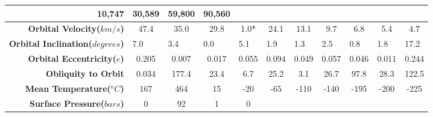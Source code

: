 \begin{landscape}
\begin{table}[H]
\begin{tabular}{|r|c|c|c|c|c|c|c|c|c|c|}
  \cellcolor[HTML]{F5F5F5}10,747 &
  \cellcolor[HTML]{FFFFFF}30,589 &
  \cellcolor[HTML]{F5F5F5}59,800 &
  \cellcolor[HTML]{FFFFFF}90,560 \\ \hline
\textbf{Orbital Velocity($km/s$)} &
  \cellcolor[HTML]{F5F5F5}47.4 &
  \cellcolor[HTML]{FFFFFF}35.0 &
  \cellcolor[HTML]{F5F5F5}29.8 &
  \cellcolor[HTML]{FFFFFF}1.0* &
  \cellcolor[HTML]{F5F5F5}24.1 &
  \cellcolor[HTML]{FFFFFF}13.1 &
  \cellcolor[HTML]{F5F5F5}9.7 &
  \cellcolor[HTML]{FFFFFF}6.8 &
  \cellcolor[HTML]{F5F5F5}5.4 &
  \cellcolor[HTML]{FFFFFF}4.7 \\ \hline
\textbf{Orbital Inclination($degrees$)} &
  \multicolumn{1}{l|}{\cellcolor[HTML]{F5F5F5}7.0} &
  \multicolumn{1}{l|}{\cellcolor[HTML]{FFFFFF}3.4} &
  \multicolumn{1}{l|}{\cellcolor[HTML]{F5F5F5}0.0} &
  \multicolumn{1}{l|}{\cellcolor[HTML]{FFFFFF}5.1} &
  \multicolumn{1}{l|}{\cellcolor[HTML]{F5F5F5}1.9} &
  \multicolumn{1}{l|}{\cellcolor[HTML]{FFFFFF}1.3} &
  \multicolumn{1}{l|}{\cellcolor[HTML]{F5F5F5}2.5} &
  \multicolumn{1}{l|}{\cellcolor[HTML]{FFFFFF}0.8} &
  \multicolumn{1}{l|}{\cellcolor[HTML]{F5F5F5}1.8} &
  \multicolumn{1}{l|}{\cellcolor[HTML]{FFFFFF}17.2} \\ \hline
\textbf{Orbital Eccentricity($e$)} &
  \cellcolor[HTML]{F5F5F5}0.205 &
  \cellcolor[HTML]{FFFFFF}0.007 &
  \cellcolor[HTML]{F5F5F5}0.017 &
  \cellcolor[HTML]{FFFFFF}0.055 &
  \cellcolor[HTML]{F5F5F5}0.094 &
  \cellcolor[HTML]{FFFFFF}0.049 &
  \cellcolor[HTML]{F5F5F5}0.057 &
  \cellcolor[HTML]{FFFFFF}0.046 &
  \cellcolor[HTML]{F5F5F5}0.011 &
  \cellcolor[HTML]{FFFFFF}0.244 \\ \hline
\textbf{Obliquity to Orbit} &
  \cellcolor[HTML]{F5F5F5}0.034 &
  \cellcolor[HTML]{FFFFFF}177.4 &
  \cellcolor[HTML]{F5F5F5}23.4 &
  \cellcolor[HTML]{FFFFFF}6.7 &
  \cellcolor[HTML]{F5F5F5}25.2 &
  \cellcolor[HTML]{FFFFFF}3.1 &
  \cellcolor[HTML]{F5F5F5}26.7 &
  \cellcolor[HTML]{FFFFFF}97.8 &
  \cellcolor[HTML]{F5F5F5}28.3 &
  \cellcolor[HTML]{FFFFFF}122.5 \\ \hline
\textbf{Mean Temperature($^oC$)} &
  \cellcolor[HTML]{F5F5F5}167 &
  \cellcolor[HTML]{FFFFFF}464 &
  \cellcolor[HTML]{F5F5F5}15 &
  \cellcolor[HTML]{FFFFFF}-20 &
  \cellcolor[HTML]{F5F5F5}-65 &
  \cellcolor[HTML]{FFFFFF}-110 &
  \cellcolor[HTML]{F5F5F5}-140 &
  \cellcolor[HTML]{FFFFFF}-195 &
  \cellcolor[HTML]{F5F5F5}-200 &
  \cellcolor[HTML]{FFFFFF}-225 \\ \hline
\textbf{Surface Pressure($bars$)} &
  \cellcolor[HTML]{F5F5F5}0 &
  \cellcolor[HTML]{FFFFFF}92 &
  \cellcolor[HTML]{F5F5F5}1 &
  \cellcolor[HTML]{FFFFFF}0 &

\end{tabular}
\end{table}
\end{landscape}
